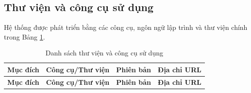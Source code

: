 \documentclass[../DoAn.tex]{subfiles}
\begin{document}
\subsection*{Thư viện và công cụ sử dụng}

Hệ thống được phát triển bằng các công cụ, ngôn ngữ lập trình và thư viện chính trong Bảng \ref{table:tools_libraries}.

\renewcommand{\arraystretch}{1.15}
\begin{longtable}{p{3.2cm} p{4.2cm} p{2.6cm} p{4.8cm}}
\caption{Danh sách thư viện và công cụ sử dụng}
\label{table:tools_libraries} \\

\hline
\textbf{Mục đích} & \textbf{Công cụ/Thư viện} & \textbf{Phiên bản} & \textbf{Địa chỉ URL} \\ \hline
\endfirsthead

\hline
\textbf{Mục đích} & \textbf{Công cụ/Thư viện} & \textbf{Phiên bản} & \textbf{Địa chỉ URL} \\ \hline
\endhead


\end{longtable}
\end{document}
